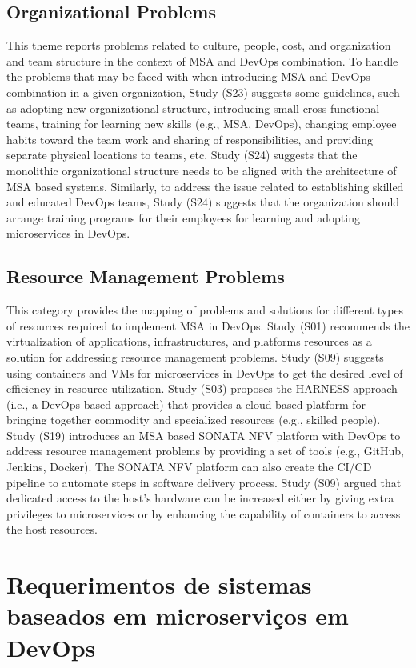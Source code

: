 \subsection{Organizational Problems}
This theme reports problems related to culture, people, cost, and organization and team structure in the context of MSA and DevOps combination. To handle the problems that may be faced with when introducing MSA and DevOps combination in a given organization, Study (S23) suggests some guidelines, such as adopting new organizational structure, introducing small cross-functional teams, training for learning new skills (e.g., MSA, DevOps), changing employee habits toward the team work and sharing of responsibilities, and providing separate physical locations to teams, etc. Study (S24) suggests that the monolithic organizational structure needs to be aligned with the architecture of MSA based systems. Similarly, to address the issue related to establishing skilled and educated DevOps teams, Study (S24) suggests that the organization should arrange training programs for their employees for learning and adopting microservices in DevOps.

\subsection{Resource Management Problems}
This category provides the mapping of problems and solutions for different types of resources required to implement MSA in DevOps. Study (S01) recommends the virtualization of applications, infrastructures, and platforms resources as a solution for addressing resource management problems. Study (S09) suggests using containers and VMs for microservices in DevOps to get the desired level of efficiency in resource utilization. Study (S03) proposes the HARNESS approach (i.e., a DevOps based approach) that provides a cloud-based platform for bringing together commodity and specialized resources (e.g., skilled people). Study (S19) introduces an MSA based SONATA NFV platform with DevOps to address resource management problems by providing a set of tools (e.g., GitHub, Jenkins, Docker). The SONATA NFV platform can also create the CI/CD pipeline to automate steps in software delivery process. Study (S09) argued that dedicated access to the host’s hardware can be increased either by giving extra privileges to microservices or by enhancing the capability of containers to access the host resources.


\section{Requerimentos de sistemas baseados em microserviços em DevOps}

